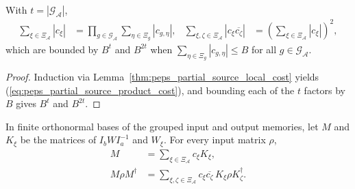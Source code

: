 \begin{lemma}
    \label{thm:peps_partial_source_product_cost}
    \leanok
    With $t=|\mathcal G_{\mathcal A}|$,
    \begin{align}
        \sum_{\xi\in\Xi_{\mathcal A}}|c_\xi|
                                         & =\prod_{g\in\mathcal G_{\mathcal A}}
        \sum_{\eta\in\Xi_g}|c_{g,\eta}|, &
        \sum_{\xi,\zeta\in\Xi_{\mathcal A}}|c_\xi\overline{c_\zeta}|
                                         & =\left(\sum_{\xi\in\Xi_{\mathcal A}}|c_\xi|\right)^2,
        \label{eq:peps_partial_source_product_cost}
    \end{align}
    which are bounded by $B^t$ and $B^{2t}$ when
    $\sum_{\eta\in\Xi_g}|c_{g,\eta}|\le B$ for all $g\in\mathcal G_{\mathcal A}$.
\end{lemma}

\begin{proof}
    \leanok
    Induction via Lemma~\ref{thm:peps_partial_source_local_cost} yields
    (\ref{eq:peps_partial_source_product_cost}), and bounding each of the $t$
    factors by $B$ gives $B^t$ and $B^{2t}$.
\end{proof}

\begin{lemma}
    \label{thm:peps_partial_source_density}
    \leanok
    In finite orthonormal bases of the grouped input and output memories, let
    $M$ and $K_\xi$ be the matrices of $I_bWI_a^{-1}$ and $W_\xi$. For every
    input matrix $\rho$,
    \begin{align}
        M & =\sum_{\xi\in\Xi_{\mathcal A}}c_\xi K_\xi,
        \label{eq:peps_partial_source_matrix}          \\
        M\rho M^\dagger
          & =\sum_{\xi,\zeta\in\Xi_{\mathcal A}}
        c_\xi\overline{c_\zeta}\,
        K_\xi\rho K_\zeta^\dagger.
        \label{eq:peps_partial_source_density}
    \end{align}
\end{lemma}

